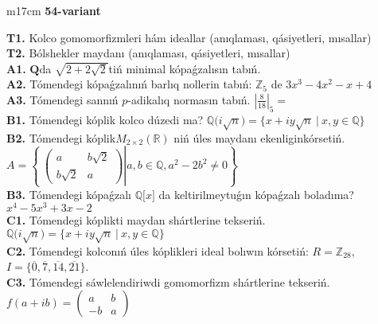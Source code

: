 \documentclass{article}
\begin{document}
\begin{tabular}{m{17cm}}
\textbf{54-variant}
\newline

\textbf{T1.} Kolco gomomorfizmleri hám ideallar (anıqlaması, qásiyetleri, mısallar) \\
\textbf{T2.} Bólshekler maydanı (anıqlaması, qásiyetleri, mısallar) \\
\textbf{A1.} \(\mathbf{Q}\)da \(\sqrt{2 + 2\sqrt{2}}\)tiń minimal kópaǵzalısın tabıń. \\
\textbf{A2.} Tómendegi kópaǵzalınıń barlıq nollerin tabıń: \(\mathbb{Z}_{5}\) de \(3x^{3} - 4x^{2} - x + 4\) \\
\textbf{A3.} Tómendegi sannıń \(p\)-adikalıq normasın tabıń. \(|\frac{8}{18}|_{5} =\) \\
\textbf{B1.} Tómendegi kóplik kolco dúzedi ma? \(\mathbb{Q(}i\sqrt{n}) = \{ x + iy\sqrt{n}\ |\ x,y \in \mathbb{Q}\}\) \\
\textbf{B2.} Tómendegi kóplik\(M_{2 \times 2}\left( \mathbb{R} \right)\) niń úles maydanı ekenliginkórsetiń. \(A = \left\{ \left. \ \begin{pmatrix}
a & b\sqrt{2} \\
b\sqrt{2} & a
\end{pmatrix} \right|a,b\mathbb{\in Q},a^{2} - 2b^{2} \neq 0 \right\}\) \\
\textbf{B3.} Tómendegi kópaǵzalı \(\mathbb{Q\lbrack}x\rbrack\) da keltirilmeytuǵın kópaǵzalı boladıma? \(x^{4} - 5x^{3} + 3x - 2\) \\
\textbf{C1.} Tómendegi kóplikti maydan shártlerine tekseriń. \(\mathbb{Q(}i\sqrt{n}) = \{ x + iy\sqrt{n}\ |\ x,y \in \mathbb{Q}\}\) \\
\textbf{C2.} Tómendegi kolconıń úles kóplikleri ideal bolıwın kórsetiń:
\(R = \mathbb{Z}_{28}\), \(I = \{\overline{0},\overline{7},\overline{14},\overline{21}\}\). \\
\textbf{C3.} Tómendegi sáwlelendiriwdi gomomorfizm shártlerine tekseriń. \(f(a + ib) = \begin{pmatrix}
a & b \\
 - b & a
\end{pmatrix}\) \\

\end{tabular}
\vspace{1cm}
\end{document}
